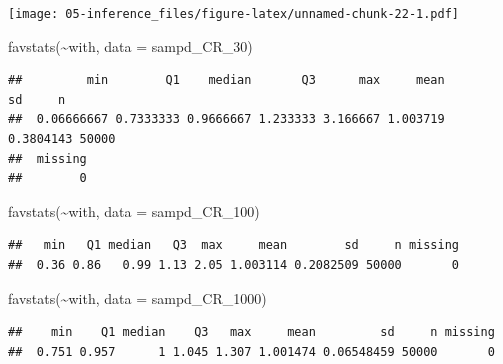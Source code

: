 \documentclass[
]{book}
\newenvironment{Shaded}{\begin{snugshade}}{\end{snugshade}}
\newcommand{\AttributeTok}[1]{\textcolor[rgb]{0.77,0.63,0.00}{#1}}
\newcommand{\FunctionTok}[1]{\textcolor[rgb]{0.00,0.00,0.00}{#1}}
\newcommand{\NormalTok}[1]{#1}
\newcommand{\SpecialCharTok}[1]{\textcolor[rgb]{0.00,0.00,0.00}{#1}}
\begin{document}
\texttt{[image: 05-inference\_files/figure-latex/unnamed-chunk-22-1.pdf]}

\begin{Shaded}
\begin{Highlighting}[]
\FunctionTok{favstats}\NormalTok{(}\SpecialCharTok{\textasciitilde{}}\NormalTok{with, }\AttributeTok{data =}\NormalTok{ sampd\_CR\_30)}
\end{Highlighting}
\end{Shaded}

\begin{verbatim}
##         min        Q1    median       Q3      max     mean        sd     n
##  0.06666667 0.7333333 0.9666667 1.233333 3.166667 1.003719 0.3804143 50000
##  missing
##        0
\end{verbatim}

\begin{Shaded}
\begin{Highlighting}[]
\FunctionTok{favstats}\NormalTok{(}\SpecialCharTok{\textasciitilde{}}\NormalTok{with, }\AttributeTok{data =}\NormalTok{ sampd\_CR\_100)}
\end{Highlighting}
\end{Shaded}

\begin{verbatim}
##   min   Q1 median   Q3  max     mean        sd     n missing
##  0.36 0.86   0.99 1.13 2.05 1.003114 0.2082509 50000       0
\end{verbatim}

\begin{Shaded}
\begin{Highlighting}[]
\FunctionTok{favstats}\NormalTok{(}\SpecialCharTok{\textasciitilde{}}\NormalTok{with, }\AttributeTok{data =}\NormalTok{ sampd\_CR\_1000)}
\end{Highlighting}
\end{Shaded}

\begin{verbatim}
##    min    Q1 median    Q3   max     mean         sd     n missing
##  0.751 0.957      1 1.045 1.307 1.001474 0.06548459 50000       0
\end{verbatim}

\begin{Shaded}
\end{Shaded}
\end{document}
